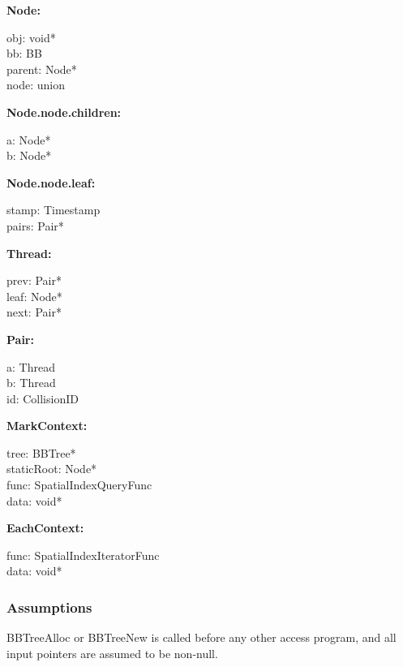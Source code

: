 \documentclass[12pt]{article}
\begin{document}
\noindent \textbf{Node:} 
\begin{multicols}{2}
	\noindent obj: void* \\
	bb: BB \\
	parent: Node* \\
	node: union
\end{multicols}

\noindent \textbf{Node.node.children:} 
\begin{multicols}{2}
	\noindent a: Node* \\
	b: Node*
\end{multicols}

\noindent \textbf{Node.node.leaf:} 
\begin{multicols}{2}
	\noindent stamp: Timestamp \\
	pairs: Pair*
\end{multicols}

\noindent \textbf{Thread:} 
\begin{multicols}{3}
	\noindent prev: Pair* \\
	leaf: Node* \\
	next: Pair*
\end{multicols}

\pagebreak %

\noindent \textbf{Pair:} 
\begin{multicols}{3}
	\noindent a: Thread \\
	b: Thread \\
	id: CollisionID
\end{multicols}

\noindent \textbf{MarkContext:} 
\begin{multicols}{2}
	\noindent tree: BBTree* \\
	staticRoot: Node* \\
	func: SpatialIndexQueryFunc \\
	data: void*
\end{multicols}

\noindent \textbf{EachContext:} 
\begin{multicols}{2}
	\noindent func: SpatialIndexIteratorFunc \\
	data: void*
\end{multicols}


\subsubsection{Assumptions} \label{SecALinked}
	BBTreeAlloc or BBTreeNew is called before any other access program, and all input pointers are assumed to be non-null.
\end{document}
